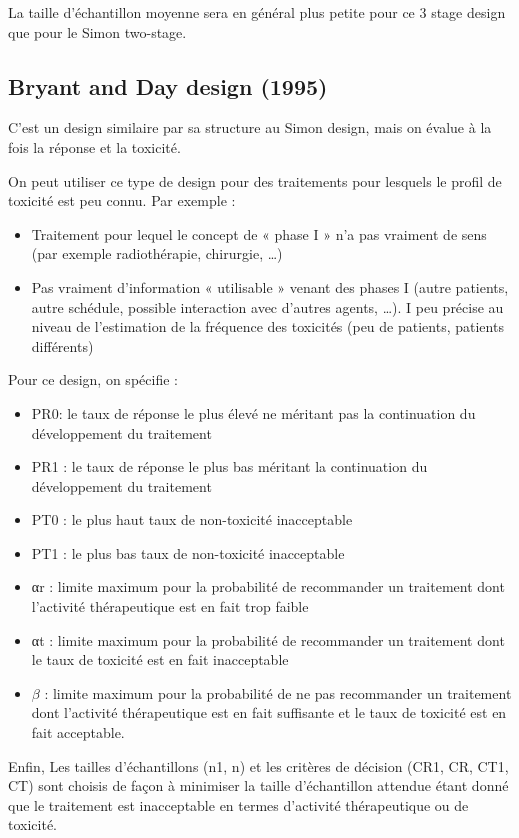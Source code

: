 La taille d’échantillon moyenne sera en général plus petite pour ce 3 stage design que pour le Simon two-stage.
\subsection{Bryant and Day design (1995)}
C'est un design similaire par sa structure au Simon design, mais on
évalue à la fois la réponse et la toxicité.

On peut utiliser ce type de design pour des traitements pour lesquels le profil de toxicité est peu connu. Par exemple :
\begin{itemize}
    \item Traitement pour lequel le concept de « phase I » n’a pas vraiment de
sens (par exemple radiothérapie, chirurgie, …)
\item Pas vraiment d’information « utilisable » venant des phases I (autre
patients, autre schédule, possible interaction avec d’autres agents, …).
\itemPhase I peu précise au niveau de l’estimation de la fréquence des
toxicités (peu de patients, patients différents)
\end{itemize}

Pour ce design, on spécifie :
\begin{itemize}
    \item PR0: le taux de réponse le plus élevé ne méritant pas la continuation du
développement du traitement
 \item PR1 : le taux de réponse le plus bas méritant la continuation du
développement du traitement
 \item PT0 : le plus haut taux de non-toxicité inacceptable
 \item PT1 : le plus bas taux de non-toxicité inacceptable
 \item αr : limite maximum pour la probabilité de recommander un traitement
dont l’activité thérapeutique est en fait trop faible
 \item αt : limite maximum pour la probabilité de recommander un traitement
dont le taux de toxicité est en fait inacceptable
 \item $\beta$ : limite maximum pour la probabilité de ne pas recommander un
traitement dont l’activité thérapeutique est en fait suffisante et le taux de
toxicité est en fait acceptable.
\end{itemize}
\vspace{0.5cm}
Enfin, Les tailles d’échantillons (n1, n) et les critères de décision (CR1, CR,
CT1, CT) sont choisis de façon à minimiser la taille d’échantillon
attendue étant donné que le traitement est inacceptable en termes
d’activité thérapeutique ou de toxicité.
